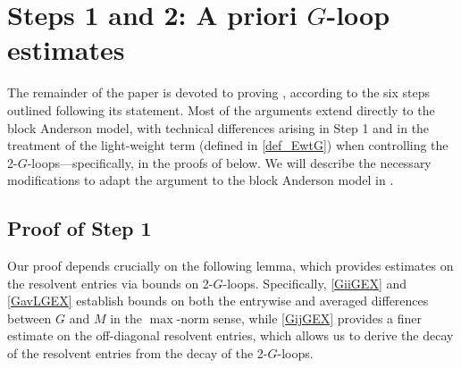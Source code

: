 \section{Steps 1 and 2: A priori \texorpdfstring{$G$}{G}-loop estimates}\label{Sec:Steps12}


The remainder of the paper is devoted to proving , according to the six steps outlined following its statement.
Most of the arguments extend directly to the block Anderson model, with technical differences arising in Step 1 and in the treatment of the light-weight term  (defined in \eqref{def_EwtG}) when controlling the 2-$G$-loops---specifically, in the proofs of  below. %
We will describe the necessary modifications to adapt the argument to the block Anderson model in .


\subsection{Proof of Step 1} 

Our proof depends crucially on the following lemma, which provides estimates on the resolvent entries via bounds on 2-$G$-loops. Specifically, \eqref{GiiGEX} and \eqref{GavLGEX} establish bounds on both the entrywise and averaged differences between $G$ and $M$ in the $\max$-norm sense, while \eqref{GijGEX} provides a finer estimate on the off-diagonal resolvent entries, which allows us to derive the decay of the resolvent entries from the decay of the 2-$G$-loops.  


